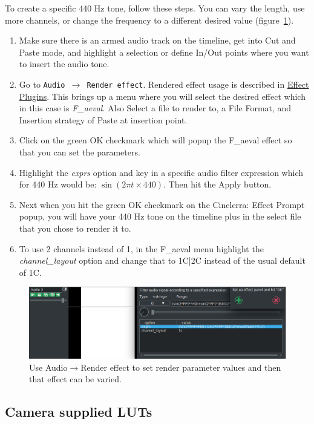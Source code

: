 To create a specific 440 Hz tone, follow these steps.  You can vary the length, use more channels, or change the frequency to a different desired value (figure~\ref{fig:aeval}).

\begin{enumerate}
	\item Make sure there is an armed audio track on the timeline, get into Cut and Paste mode, and highlight
	a selection or define In/Out points where you want to insert the audio tone.
	\item Go to \texttt{Audio $\rightarrow$ Render effect}.  Rendered effect usage is described in \hyperref[sec:rendered_effects]{Effect Plugins}. This brings up a menu where you will select the desired effect which in this case is \textit{F\_aeval}.  Also Select a file to render to, a File Format, and Insertion strategy of Paste at insertion point.
	\item Click on the green OK checkmark which will popup the F\_aeval effect so that you can set the
	parameters.
	\item Highlight the \textit{exprs} option and key in a specific audio filter expression which for 440 Hz would be:
	$\sin(2\pi t\times440)$.  Then hit the Apply button.
	\item Next when you hit the green OK checkmark on the Cinelerra: Effect Prompt popup, you will have
	your 440 Hz tone on the timeline plus in the select file that you chose to render it to.
	\item To use 2 channels instead of 1, in the F\_aeval menu highlight the \textit{channel\_layout} option and change
	that to 1C|2C instead of the usual default of 1C.
\end{enumerate}

\begin{figure}[htpb]
	\centering
	\includegraphics[width=1.0\linewidth]{images/aeval.png}
	\caption{Use Audio$\rightarrow$Render effect to set render parameter values and then that effect can be varied.}
	\label{fig:aeval}
\end{figure}

\subsection{Camera supplied LUTs}%
\label{sub:camera_supplied_luts}

